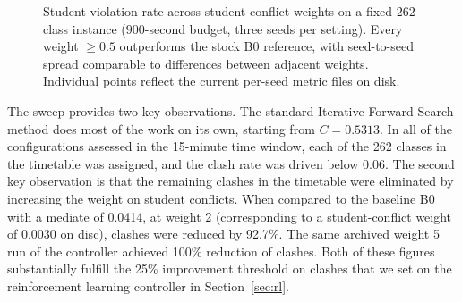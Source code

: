 \documentclass[journal]{IEEEtran}
\begin{document}
\begin{figure}[t]
\centering
{}
\caption{Student violation rate across student-conflict weights on a fixed $262$-class instance ($900$-second budget, three seeds per setting). Every weight $\ge 0.5$ outperforms the stock B0 reference, with seed-to-seed spread comparable to differences between adjacent weights. Individual points reflect the current per-seed metric files on disk.}
\label{fig:sweep}
\end{figure}

The sweep provides two key observations. The standard Iterative Forward Search method does most of the work on its own, starting from $C=0.5313$. In all of the configurations assessed in the 15-minute time window, each of the 262 classes in the timetable was assigned, and the clash rate was driven below 0.06. The second key observation is that the remaining clashes in the timetable were eliminated by increasing the weight on student conflicts. When compared to the baseline B0 with a mediate of 0.0414, at weight 2 (corresponding to a student-conflict weight of 0.0030 on disc), clashes were reduced by 92.7\%. The same archived weight 5 run of the controller achieved 100\% reduction of clashes. Both of these figures substantially fulfill the 25\% improvement threshold on clashes that we set on the reinforcement learning controller in Section~\ref{sec:rl}.
\end{document}
